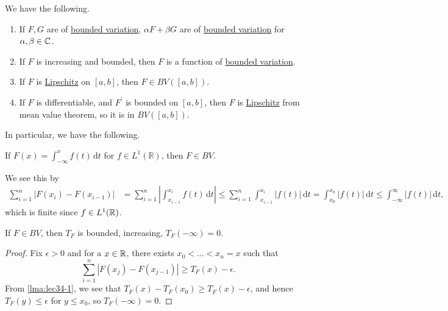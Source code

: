 \begin{remark}
	We have the following.
	\begin{enumerate}[(1)]
		\item If \(F,G\) are of \hyperref[def:bounded-variation]{bounded variation}, \(\alpha F + \beta G\) are of \hyperref[def:bounded-variation]{bounded variation}
		      for \(\alpha , \beta \in \mathbb{\MakeUppercase{c}} \).
		\item If \(F\) is increasing and bounded, then \(F\) is a function of \hyperref[def:bounded-variation]{bounded variation}.
		\item If \(F\) is \hyperref[def:Lipschitz]{Lipschitz} on \([a,b]\), then \(F \in BV([a,b])\).
		\item If \(F\) is differentiable, and \(F^\prime\) is bounded on \([a,b]\), then \(F\) is \hyperref[def:Lipschitz]{Lipschitz} from mean value theorem,
		      so it is in \(BV([a,b])\).
	\end{enumerate}
\end{remark}

In particular, we have the following.
\begin{remark}
	If \(F(x) = \int_{-\infty}^x f(t) \,\mathrm{d} t\) for \(f \in L^1(\mathbb{R})\), then \(F \in BV\).
\end{remark}
\begin{explanation}
	We see this by
	\[
		\begin{split}
			\sum_{i=1}^n \left\vert F(x_i) - F(x_{i-1}) \right\vert &= \sum_{i=1}^n \left\vert \int_{x_{i-1}}^{x_i} f(t) \,\mathrm{d} t \right\vert
			\leq \sum_{i=1}^n \int_{x_{i-1}}^{x_i} \left\vert f(t) \right\vert \,\mathrm{d} t
			= \int_{x_0}^{x_n} \left\vert f(t) \right\vert \,\mathrm{d} t
			\leq \int_{-\infty}^\infty \left\vert f(t) \right\vert \,\mathrm{d} t,
		\end{split}
	\]
	which is finite since \(f\in L^1(\mathbb{\MakeUppercase{r}} )\).
\end{explanation}

\begin{lemma}\label{lma:lec34-2}
	If \(F \in BV\), then \(T_F\) is bounded, increasing, \(T_F(-\infty) = 0\).
\end{lemma}
\begin{proof}
	Fix \(\epsilon > 0\) and for a \(x\in \mathbb{\MakeUppercase{r}} \), there exists \(x_0 < \ldots < x_n = x \) such that
	\[
		\sum\limits_{i=1}^{n} \left\vert F(x_{j} ) - F(x_{j-1})\right\vert \geq T_{F} (x) - \epsilon.
	\]
	From \autoref{lma:lec34-1}, we see that \(T_{F} (x) - T_{F} (x_0) \geq T_{F} (x) - \epsilon \), and hence
	\(T_{F} (y) \leq \epsilon \) for \(y\leq x_0\), so \(T_{F} (-\infty ) = 0\).
\end{proof}

